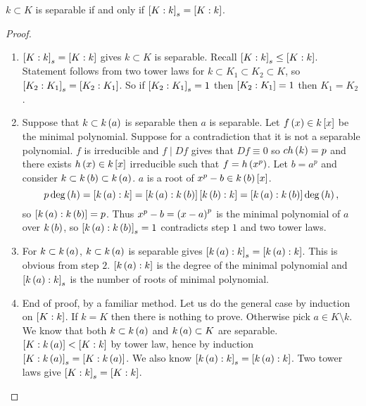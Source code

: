 \begin{theorem}
$ k \subset K $ is separable if and only if $ \sb{K : k}_s = \sb{K : k} $.
\end{theorem}

\begin{proof}
\hfill
\begin{enumerate}[leftmargin=0.5in, label=Step \arabic*.]
\item $ \sb{K : k}_s = \sb{K : k} $ gives $ k \subset K $ is separable. Recall $ \sb{K : k}_s \le \sb{K : k} $. Statement follows from two tower laws for $ k \subset K_1 \subset K_2 \subset K $, so $ \sb{K_2 : K_1}_s = \sb{K_2 : K_1} $. So if $ \sb{K_2 : K_1}_s = 1 $ then $ \sb{K_2 : K_1} = 1 $ then $ K_1 = K_2 $.
\item Suppose that $ k \subset k\rb{a} $ is separable then $ a $ is separable. Let $ f\rb{x} \in k\sb{x} $ be the minimal polynomial. Suppose for a contradiction that it is not a separable polynomial. $ f $ is irreducible and $ f \mid Df $ gives that $ Df \equiv 0 $ so $ ch\rb{k} = p $ and there exists $ h\rb{x} \in k\sb{x} $ irreducible such that $ f = h\rb{x^p} $. Let $ b = a^p $ and consider $ k \subset k\rb{b} \subset k\rb{a} $. $ a $ is a root of $ x^p - b \in k\rb{b}\sb{x} $.
$$ p\deg\rb{h} = \sb{k\rb{a} : k} = \sb{k\rb{a} : k\rb{b}}\sb{k\rb{b} : k} = \sb{k\rb{a} : k\rb{b}}\deg\rb{h}, $$
so $ \sb{k\rb{a} : k\rb{b}} = p $. Thus $ x^p - b = \rb{x - a}^p $ is the minimal polynomial of $ a $ over $ k\rb{b} $, so $ \sb{k\rb{a} : k\rb{b}}_s = 1 $ contradicts step $ 1 $ and two tower laws.
\item For $ k \subset k\rb{a} $, $ k \subset k\rb{a} $ is separable gives $ \sb{k\rb{a} : k}_s = \sb{k\rb{a} : k} $. This is obvious from step $ 2 $. $ \sb{k\rb{a} : k} $ is the degree of the minimal polynomial and $ \sb{k\rb{a} : k}_s $ is the number of roots of minimal polynomial.
\item End of proof, by a familiar method. Let us do the general case by induction on $ \sb{K : k} $. If $ k = K $ then there is nothing to prove. Otherwise pick $ a \in K \setminus k $. We know that both $ k \subset k\rb{a} $ and $ k\rb{a} \subset K $ are separable. $ \sb{K : k\rb{a}} < \sb{K : k} $ by tower law, hence by induction $ \sb{K : k\rb{a}}_s = \sb{K : k\rb{a}} $. We also know $ \sb{k\rb{a} : k}_s = \sb{k\rb{a} : k} $. Two tower laws give $ \sb{K : k}_s = \sb{K : k} $.
\end{enumerate}
\end{proof}


